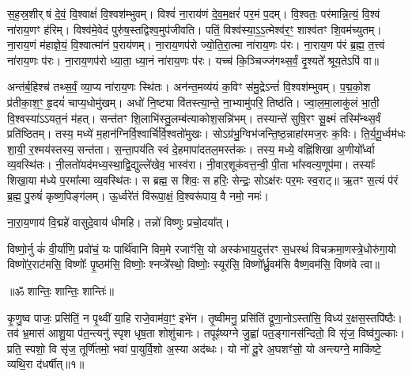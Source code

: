 
स॒ह॒स्र॒शीर्षं दे॒वं॒ वि॒श्वाक्षं॑ वि॒श्वश॑म्भुवम्। विश्वं॑ ना॒राय॑णं दे॒व॒म॒क्षरं॑ पर॒मं प॒दम्। 
वि॒श्वतः॒ पर॑मान्नि॒त्यं॒ वि॒श्वं ना॑राय॒णꣳ ह॑रिम्। विश्व॑मे॒वेदं पुरु॑ष॒स्तद्विश्व॒मुप॑जीवति। 
पतिं॒   विश्व॑स्या॒ऽ॒ऽ॒त्मेश्व॑र॒ꣳ॒ शाश्व॑तꣳ शि॒वम॑च्युतम्। ना॒राय॒णं म॑हाज्ञे॒यं॒ वि॒श्वात्मा॑नं प॒राय॑णम्। ना॒राय॒णप॑रो ज्यो॒ति॒रा॒त्मा ना॑राय॒णः प॑रः। ना॒राय॒ण प॑रं ब्र॒ह्म॒ त॒त्त्वं ना॑राय॒णः प॑रः। ना॒राय॒णप॑रो ध्या॒ता॒ ध्या॒नं ना॑राय॒णः प॑रः। यच्च॑ कि॒ञ्चिज्ज॑गथ्स॒र्वं॒ दृ॒श्यते᳚ श्रूय॒तेऽपि॑ वा॥ 

अन्त॑र्ब॒हिश्च॑ तथ्स॒र्वं॒ व्या॒प्य ना॑राय॒णः स्थि॑तः। अन॑न्त॒मव्य॑यं क॒विꣳ स॑मु॒द्रेऽन्तं॑  वि॒श्वश॑म्भुवम्। प॒द्म॒को॒श प्र॑तीका॒श॒ꣳ॒ हृ॒दयं॑ चाप्य॒धोमु॑खम्। अधो॑ नि॒ष्ट्या वि॑तस्त्या॒न्ते॒ ना॒भ्यामु॑परि॒ तिष्ठ॑ति। ज्वा॒ल॒मा॒लाकु॑लं भा॒ती॒ वि॒श्वस्या॑ऽऽयत॒नं म॑हत्। सन्त॑तꣳ शि॒लाभि॑स्तु॒\-लम्ब॑त्याकोश॒सन्नि॑भम्। तस्यान्ते॑ सुषि॒रꣳ सू॒क्ष्मं तस्मि᳚न्थ्स॒र्वं प्रति॑ष्ठितम्। तस्य॒ मध्ये॑ म॒हान॑\-ग्निर्वि॒श्वार्चि॑र्वि॒श्वतो॑मुखः। सोऽग्र॑भु॒ग्विभ॑जन्ति॒ष्ठ॒न्नाहा॑रमज॒रः क॒विः। ति॒र्य॒गू॒र्ध्वम॑धः शा॒यी॒ र॒श्मय॑स्तस्य॒ सन्त॑ता। स॒न्ता॒पय॑ति स्वं दे॒हमापा॑दतल॒मस्त॑कः। तस्य॒ मध्ये॒ वह्नि॑शिखा अ॒णीयो᳚र्ध्वा व्य॒वस्थि॑तः। नी॒लतो॑यद॑\-मध्य॒स्था॒द्वि॒द्युल्ले॑खेव॒  भास्व॑रा। नी॒वार॒शूक॑वत्त॒न्वी॒ पी॒ता भा᳚स्वत्य॒णूप॑मा। तस्याः᳚ शिखा॒या म॑ध्ये प॒रमा᳚त्मा व्य॒वस्थि॑तः। स ब्रह्म॒ स शिवः॒ स हरिः॒ सेन्द्रः॒ सोऽक्ष॑रः पर॒मः स्व॒राट्॥ 
ऋ॒तꣳ स॒त्यं प॑रं ब्र॒ह्म॒ पु॒रुषं॑ कृष्ण॒पिङ्ग॑लम्। ऊ॒र्ध्वरे॑तं वि॑रूपा॒क्षं॒ वि॒श्वरू॑पाय॒ वै नमो॒ नमः॑। 

ना॒रा॒य॒णाय॑ वि॒द्महे॑ वासुदे॒वाय॑ धीमहि। तन्नो॑ विष्णुः प्रचो॒दया᳚त्। 

विष्णो॒र्नु कं॑ वी॒र्या॑णि॒ प्रवो॑चं॒ यः पार्थि॑वानि विम॒मे रजाꣳ॑सि॒ यो अस्क॑भाय॒दुत्त॑रꣳ स॒धस्थं॑ विचक्रमा॒णस्त्रे॒धोरु॑गा॒यो विष्णो॑र॒राट॑मसि॒ विष्णोः᳚ पृ॒ष्ठम॑सि॒ विष्णोः॒ श्नप्त्रे᳚स्थो॒ विष्णोः॒ स्यूर॑सि॒ विष्णो᳚र्ध्रु॒वम॑सि वैष्ण॒वम॑सि॒ विष्ण॑वे त्वा॥ 

\centerline{॥ॐ शान्तिः॒ शान्तिः॒ शान्तिः॑॥}


कृ॒णु॒ष्व पाजः॒ प्रसि॑तिं॒ न पृ॒थ्वीं या॒हि राजे॒वाम॑वा॒ꣳ॒ इभे॑न। तृ॒ष्वीमनु॒ प्रसि॑तिं द्रूणा॒नोऽस्ता॑सि॒ विध्य॑ र॒क्षस॒स्तपि॑ष्ठैः। तव॑ भ्र॒मास॑ आशु॒या प॑त॒न्त्यनु॑ स्पृश धृष॒ता शोशु॑चानः। तपूꣴ॑ष्यग्ने जु॒ह्वा॑ पत॒ङ्गानस॑न्दितो॒ वि सृ॑ज॒ विष्व॑गु॒ल्काः। प्रति॒ स्पशो॒ वि सृ॑ज॒ तूर्णि॑तमो॒ भवा॑ पा॒युर्वि॒शो अ॒स्या अद॑ब्धः। यो नो॑ दू॒रे अ॒घशꣳ॑सो॒  यो अन्त्यग्ने॒ माकि॑ष्टे॒ व्यथि॒रा द॑धर्षीत्॥१॥

